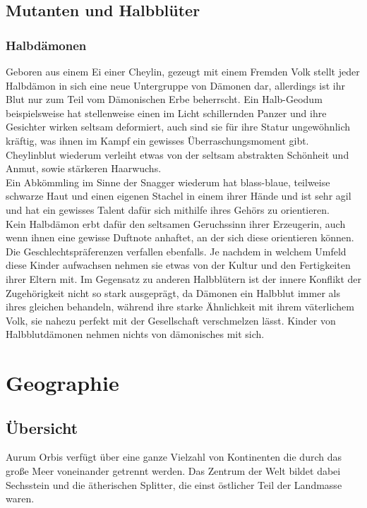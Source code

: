 \documentclass[a4paper,12pt,oneside]{book}
\begin{document}
\chapter{Mutanten und Halbblüter}
\section{Halbdämonen}
Geboren aus einem Ei einer Cheylin, gezeugt mit einem Fremden Volk stellt jeder Halbdämon in sich eine neue Untergruppe von Dämonen dar, allerdings ist ihr Blut nur zum Teil vom Dämonischen Erbe beherrscht.
Ein Halb-Geodum beispielsweise hat stellenweise einen im Licht schillernden Panzer und ihre Gesichter wirken seltsam deformiert, auch sind sie für ihre Statur ungewöhnlich kräftig, was ihnen im Kampf ein gewisses Überraschungsmoment gibt. 
\\Cheylinblut wiederum verleiht etwas von der seltsam abstrakten Schönheit und Anmut, sowie stärkeren Haarwuchs.
\\Ein Abkömmling im Sinne der Snagger wiederum hat blass-blaue, teilweise schwarze Haut und einen eigenen Stachel in einem ihrer Hände und ist sehr agil und hat ein gewisses Talent dafür sich mithilfe ihres Gehörs zu orientieren.
\\Kein Halbdämon erbt dafür den seltsamen Geruchssinn ihrer Erzeugerin, auch wenn ihnen eine gewisse Duftnote anhaftet, an der sich diese orientieren können. Die Geschlechtspräferenzen verfallen ebenfalls. Je nachdem in welchem Umfeld diese Kinder aufwachsen nehmen sie etwas von der Kultur und den Fertigkeiten ihrer Eltern mit. Im Gegensatz zu anderen Halbblütern ist der innere Konflikt der Zugehörigkeit nicht so stark ausgeprägt, da Dämonen ein Halbblut immer als ihres gleichen behandeln, während ihre starke Ähnlichkeit mit ihrem väterlichem Volk, sie nahezu perfekt mit der Gesellschaft verschmelzen lässt. Kinder von Halbblutdämonen nehmen nichts von dämonisches mit sich.

\part{Geographie}
\setcounter{chapter}{0}
\chapter{Übersicht}
Aurum Orbis verfügt über eine ganze Vielzahl von Kontinenten die durch das große Meer voneinander getrennt werden. Das Zentrum der Welt bildet dabei Sechsstein und die ätherischen Splitter, die einst östlicher Teil der Landmasse waren.
\end{document}
